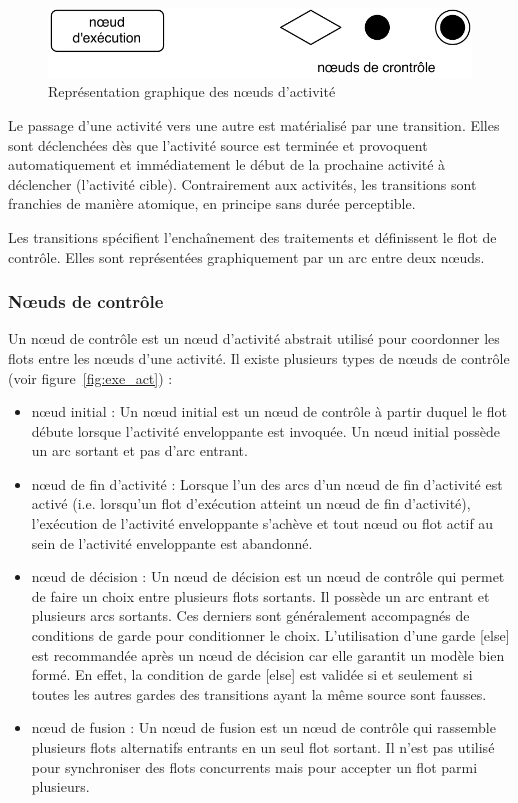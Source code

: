\documentclass[11pt,a4paper]{paper}
\begin{document}
\begin{appendices}
 \begin{figure}[htbp]
\begin{center}
\includegraphics[scale=0.6]{figures_pdf/noeud_activite}
\caption{Représentation graphique des n{\oe}uds d'activité}
\label{fig:noeuds_act}
\end{center}
\end{figure}
\FloatBarrier

Le passage d'une activité vers une autre est matérialisé par une transition. Elles sont déclenchées dès que l'activité source est terminée et provoquent automatiquement et immédiatement le début de la prochaine activité à déclencher (l'activité cible). Contrairement aux activités, les transitions sont franchies de manière atomique, en principe sans durée perceptible.

Les transitions spécifient l'enchaînement des traitements et définissent le flot de contrôle. Elles sont représentées graphiquement par un arc entre deux n{\oe}uds. 

\subsubsection{N{\oe}uds de contrôle}
Un n{\oe}ud de contrôle est un n{\oe}ud d'activité abstrait utilisé pour coordonner les flots entre les n{\oe}uds d'une activité.
Il existe plusieurs types de n{\oe}uds de contrôle (voir figure~\ref{fig:exe_act}) :
\begin{itemize}
\item n{\oe}ud initial : Un n{\oe}ud initial est un n{\oe}ud de contrôle à partir duquel le flot débute lorsque l'activité enveloppante est invoquée. Un n{\oe}ud initial possède un arc sortant et pas d'arc entrant.
\item n{\oe}ud de fin d'activité : Lorsque l'un des arcs d'un n{\oe}ud de fin d'activité est activé (i.e. lorsqu'un flot d'exécution atteint un n{\oe}ud de fin d'activité), l'exécution de l'activité enveloppante s'achève et tout n{\oe}ud ou flot actif au sein de l'activité enveloppante est abandonné.
\item n{\oe}ud de décision : Un n{\oe}ud de décision est un n{\oe}ud de contrôle qui permet de faire un choix entre plusieurs flots sortants. Il possède un arc entrant et plusieurs arcs sortants. Ces derniers sont généralement accompagnés de conditions de garde pour conditionner le choix. L'utilisation d'une garde [else] est recommandée après un n{\oe}ud de décision car elle garantit un modèle bien formé. En effet, la condition de garde [else] est validée si et seulement si toutes les autres gardes des transitions ayant la même source sont fausses.
\item n{\oe}ud de fusion : Un n{\oe}ud de fusion est un n{\oe}ud de contrôle qui rassemble plusieurs flots alternatifs entrants en un seul flot sortant. Il n'est pas utilisé pour synchroniser des flots concurrents mais pour accepter un flot parmi plusieurs.
\end{itemize}


\end{appendices}
\end{document}
